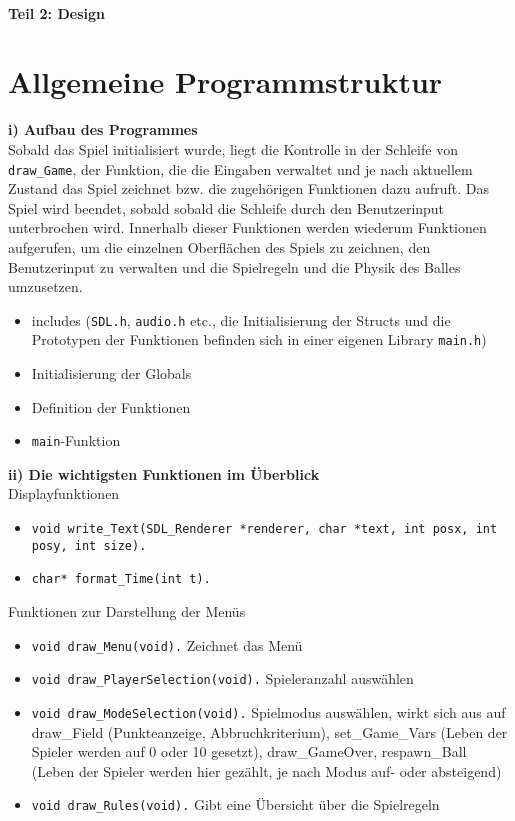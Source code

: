 \documentclass[a4paper, 10pt]{article}
\begin{document}
\paragraph {\Large\bf  Teil 2: Design} 

\section{Allgemeine Programmstruktur}
{\bf i) Aufbau des Programmes}\medskip\\
Sobald das Spiel initialisiert wurde, liegt die Kontrolle in der Schleife von \texttt{draw\_Game}, der Funktion, die die Eingaben verwaltet und je nach aktuellem Zustand das Spiel zeichnet  bzw. die zugehörigen Funktionen dazu aufruft. Das Spiel wird beendet, sobald sobald die Schleife durch den Benutzerinput unterbrochen wird. Innerhalb dieser Funktionen werden wiederum Funktionen aufgerufen, um die einzelnen Oberflächen des Spiels zu zeichnen, den Benutzerinput zu verwalten und die Spielregeln und die Physik des Balles umzusetzen.
\begin{itemize}
\item includes (\texttt{SDL.h}, \texttt{audio.h} etc., die Initialisierung der Structs und die Prototypen der Funktionen befinden sich in einer eigenen Library \texttt{main.h})
\item Initialisierung der Globals
\item Definition der Funktionen
\item \texttt{main}-Funktion
\end{itemize}
 \medskip
{\bf ii) Die wichtigsten Funktionen im Überblick}\medskip\\
Displayfunktionen
\begin{itemize}
\item \texttt{void write\_Text(SDL\_Renderer *renderer, char *text, int posx, int posy, int size).} 
\item \texttt{char* format\_Time(int t).}
\end{itemize}
\medskip
Funktionen zur Darstellung der Menüs
\begin{itemize}
\item \texttt{void draw\_Menu(void).} Zeichnet das Menü
\item \texttt{void draw\_PlayerSelection(void).} Spieleranzahl auswählen
\item \texttt{void draw\_ModeSelection(void).} Spielmodus auswählen, wirkt sich aus auf draw\_Field (Punkteanzeige, Abbruchkriterium), set\_Game\_Vars (Leben der Spieler werden auf 0 oder 10 gesetzt), draw\_GameOver, respawn\_Ball (Leben der Spieler werden hier gezählt, je nach Modus auf- oder absteigend)
\item \texttt{void draw\_Rules(void).} Gibt eine Übersicht über die Spielregeln
\end{itemize}
\end{document}
